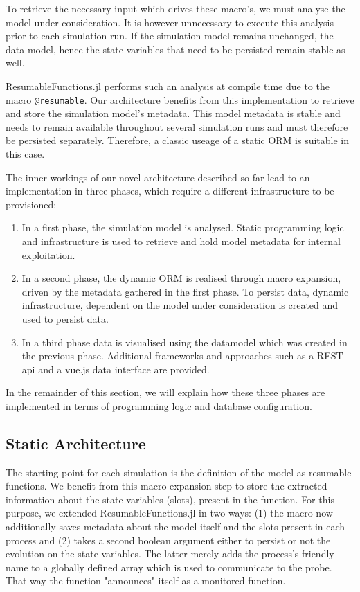 \documentclass{juliacon}
\begin{document}
To retrieve the necessary input which drives these macro's, we must analyse the model under consideration. It is however unnecessary to execute this analysis prior to each simulation run. If the simulation model remains unchanged, the data model, hence the state variables that need to be persisted remain stable as well.\vskip 6pt

ResumableFunctions.jl performs such an analysis at compile time due to the macro \texttt{@resumable}. Our architecture benefits from this implementation to retrieve and store the simulation model's metadata. This model metadata is stable and needs to remain available throughout several simulation runs and must therefore be persisted separately. Therefore, a classic useage of a static ORM is suitable in this case.\vskip 6pt

The inner workings of our novel architecture described so far lead to an implementation in three phases, which require a different infrastructure to be provisioned:

\begin{enumerate}
	\item In a first phase, the simulation model is analysed. Static programming logic and infrastructure is used to retrieve and hold model metadata for internal exploitation.
	\item In a second phase, the dynamic ORM is realised through macro expansion, driven by the metadata gathered in the first phase. To persist data, dynamic infrastructure, dependent on the model under consideration is created and used to persist data.
	\item In a third phase data is visualised using the datamodel which was created in the previous phase. Additional frameworks and approaches such as a REST-api and a vue.js data interface are provided.
\end{enumerate}

In the remainder of this section, we will explain how these three phases are implemented in terms of programming logic and database configuration.

\subsection{Static Architecture}\label{statArch}

The starting point for each simulation is the definition of the model as resumable functions. We benefit from this macro expansion step to store the extracted information about the state variables (slots), present in the function. For this purpose, we extended ResumableFunctions.jl in two ways: (1) the macro now additionally saves metadata about the model itself and the slots present in each process and (2) takes a second boolean argument either to persist or not the evolution on the state variables. The latter merely adds the process's friendly name to a globally defined array which is used to communicate to the probe. That way the function "announces" itself as a monitored function.\vskip 6pt
\end{document}
